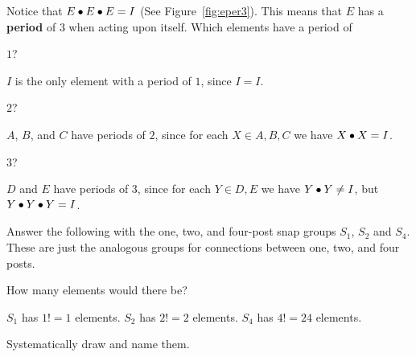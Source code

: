 \documentclass[../gatm_answers.tex]{subfiles}
\begin{document}
\begin{outer_problem}
	\item Notice that $E\bullet E\bullet E=I$ (See Figure~\ref{fig:eper3}). This means that $E$ has a \textbf{period} of $3$ when acting upon itself. Which elements have a period of
\end{outer_problem}

\begin{inner_problem}[start=1]
	 \item $1$?
\end{inner_problem}

\noindent $I$ is the only element with a period of $1$, since $I=I$.

\begin{inner_problem}
	 \item $2$?
\end{inner_problem}

\noindent $A$, $B$, and $C$ have periods of $2$, since for each $X\in{A,B,C}$ we have $X\bullet X = I$.

\begin{inner_problem}
	 \item $3$?
\end{inner_problem}

\noindent $D$ and $E$ have periods of $3$, since for each $Y\in {D,E}$ we have $Y\bullet Y\neq I$, but $Y\bullet Y\bullet Y=I$.

\begin{outer_problem}
	\item Answer the following with the one, two, and four-post snap groups $S_1$, $S_2$ and $S_4$. These are just the analogous groups for connections between one, two, and four posts.
\end{outer_problem}

\begin{inner_problem}[start=1]
	\item How many elements would there be?
\end{inner_problem}

\noindent $S_1$ has $1!=1$ elements. $S_2$ has $2!=2$ elements. $S_4$ has $4!=24$ elements.

\begin{inner_problem}
	\item Systematically draw and name them.
\end{inner_problem}
\end{document}
